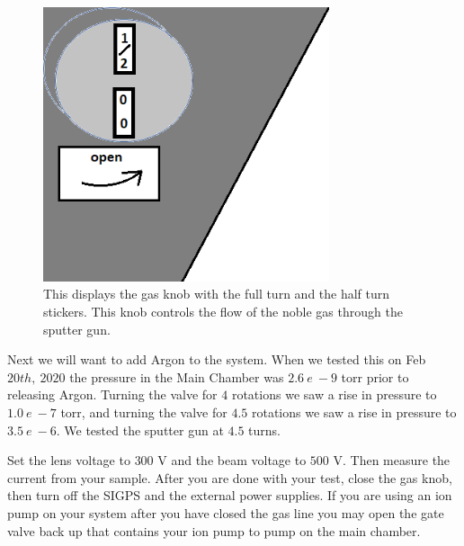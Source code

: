 \documentclass[11pt,a4paper]{report}
\begin{document}
\begin{figure}[H]
\includegraphics[width=0.75\textwidth]{sputter_gas_knob.png}
\caption{This displays the gas knob with the full turn and the half turn stickers. This knob controls the flow of the noble gas through the sputter gun. }
\label{gassticker}
\end{figure}


Next we will want to add Argon to the system. When we tested this on Feb $20th, \ 2020$ the pressure in the Main Chamber was $2.6 \ e \ -9$ torr prior to releasing Argon. Turning the valve for $4$ rotations we saw a rise in pressure to $1.0 \ e \ -7$ torr, and turning the valve for $4.5$ rotations we saw a rise in pressure to $3.5 \ e \ -6$. We tested the sputter gun at $4.5$ turns. 

 Set the lens voltage to $300$ V and the beam voltage to $500$ V. Then measure the current from your sample. After you are done with your test, close the gas knob, then turn off the SIGPS and the external power supplies. If you are using an ion pump on your system after you have closed the gas line you may open the gate valve back up that contains your ion pump to pump on the main chamber.

\end{document}
